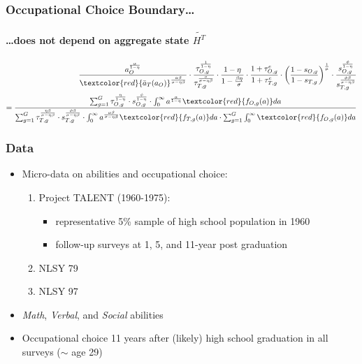 \documentclass[11pt]{beamer}
\begin{document}
		\begin{frame}
			\frametitle{Occupational Choice Boundary\ldots}
			\framesubtitle{\ldots does not depend on aggregate state $\widetilde{H^T}$} 
			\footnotesize
			\begin{align*}
				\frac{a_O^{\frac{\alpha}{1-\eta}}}{\textcolor{red}{\bar{a}_T(a_O)}^{\frac{\alpha\beta}{\sigma-\eta\beta}}} \cdot \frac{\tau_{O,g}^\frac{1}{1-\eta}}{\tau_{T,g}^\frac{\sigma}{\sigma-\eta\beta}} \cdot \frac{1-\eta}{1-\tfrac{\beta \eta}{\sigma}} \cdot \frac{1+\tau^e_{O,g}}{1+\tau^e_{T,g}} \cdot \left(\frac{1-s_{O,g}}{1-s_{T,g}}\right)^\frac{1}{\mu} \cdot \frac{s_{O,g}^\frac{\phi}{1-\eta}}{s_{T,g}^\frac{\phi\beta}{\sigma-\eta\beta}} \nonumber\\
				= \frac{\sum_{g=1}^G \tau_{O,g}^\frac{\eta}{1-\eta} \cdot s_{O,g}^{\frac{\phi}{1-\eta}} \cdot \int_0^\infty a^{\frac{\alpha}{1-\eta}} \textcolor{red}{f_{O,g}(a)}da }{\sum_{g=1}^G \tau_{T,g}^\frac{\eta\beta}{\sigma-\eta\beta} \cdot s_{T,g}^\frac{\phi\beta}{\sigma-\eta\beta} \cdot \int_0^\infty a^{\frac{\alpha\beta}{\sigma-\eta\beta}} \textcolor{red}{f_{T,g}(a)}da \cdot \sum_{g=1}^G \int_0^\infty \textcolor{red}{f_{O,g}(a)}da  } \nonumber
			\end{align*}
		\end{frame}
		
		\begin{frame}
			\frametitle{Data}
			\begin{itemize}
				\item Micro-data on abilities and occupational choice:
				\begin{enumerate}
					\item Project TALENT (1960-1975):
					\begin{itemize}
						\item representative 5\% sample of high school population in 1960
						\item follow-up surveys at 1, 5, and 11-year post graduation
					\end{itemize}
					\item NLSY 79
					\item NLSY 97
				\end{enumerate}
				\item \textit{Math}, \textit{Verbal}, and \textit{Social} abilities
				\item Occupational choice 11 years after (likely) high school graduation in all surveys ($\sim$ age 29)
			\end{itemize}
		\end{frame}
		
\end{document}
